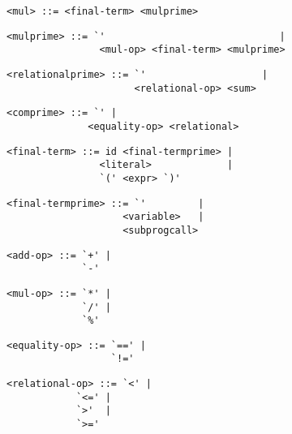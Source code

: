 \begin{footnotesize}
\begin{lstlisting}[frame=single, label={mul}, language=pie]
<mul> ::= <final-term> <mulprime>
\end{lstlisting}

\begin{lstlisting}[frame=single, label={mulprime}, language=pie]
<mulprime> ::= `'                              | 
                <mul-op> <final-term> <mulprime>
\end{lstlisting}

\begin{lstlisting}[frame=single, label={relationalprime}, language=pie]
<relationalprime> ::= `'                    | 
                      <relational-op> <sum>
\end{lstlisting}

\begin{lstlisting}[frame=single, label={comprime}, language=pie]
<comprime> ::= `' |
              <equality-op> <relational>
\end{lstlisting}

\begin{lstlisting}[frame=single, label={final-term}, language=pie]
<final-term> ::= id <final-termprime> | 
                <literal>             | 
                `(' <expr> `)'
\end{lstlisting}

\begin{lstlisting}[frame=single, label={final-termprime}, language=pie]
<final-termprime> ::= `'         | 
                    <variable>   | 
                    <subprogcall>  
\end{lstlisting}

\begin{lstlisting}[frame=single, label={add-op}, language=pie]
<add-op> ::= `+' | 
             `-'
\end{lstlisting}

\begin{lstlisting}[frame=single, label={mul-op}, language=pie]
<mul-op> ::= `*' | 
             `/' |
             `%'
\end{lstlisting}

\begin{lstlisting}[frame=single, label={equality-op}, language=pie]
<equality-op> ::= `==' | 
                  `!='
\end{lstlisting}

\begin{lstlisting}[frame=single, label={relational-op}, language=pie]
<relational-op> ::= `<' | 
	   	    `<=' |
		    `>'  |
		    `>='
\end{lstlisting}


\end{footnotesize}
